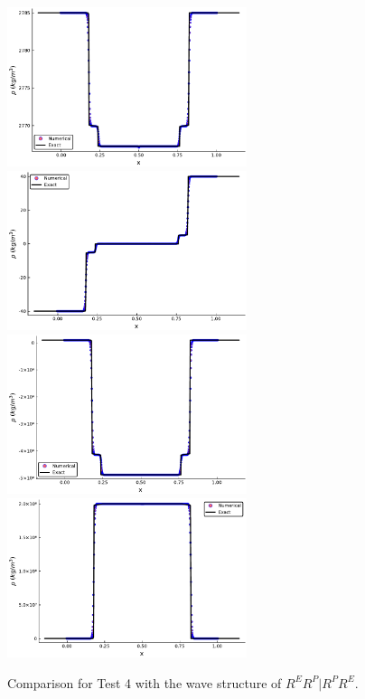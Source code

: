 \documentclass[review]{elsarticle}
\numberwithin{equation}{section}
\numberwithin{table}{section}
\begin{document}
\begin{figure}[ht]
  \centering

 \includegraphics[width= 7cm] {case3rho.pdf}
  \includegraphics[width= 7cm] {case3u.pdf}
  \includegraphics[width= 7cm] {case3p.pdf}
  \includegraphics[width= 7cm] {case3sxx.pdf}

    \caption{Comparison for Test 4 with the wave structure of $R^ER^P|R^PR^E$.  }
  \label{fig:case4}
\end{figure}
\end{document}
